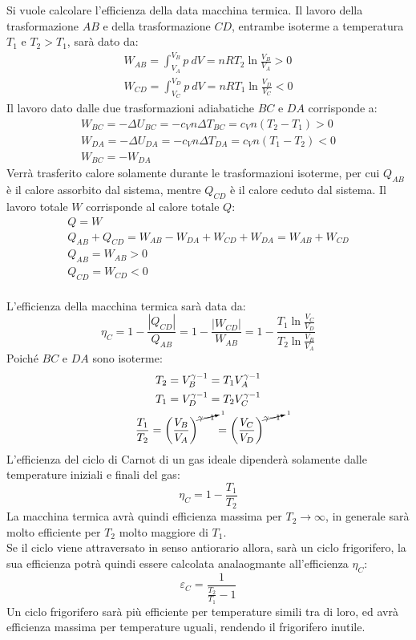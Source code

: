 \documentclass{article}
\numberwithin{equation}{subsection}
\begin{document}
Si vuole calcolare l'efficienza della data macchina termica. Il 
lavoro della trasformazione $AB$ e della trasformazione $CD$, entrambe isoterme a temperatura $T_1$ e $T_2>T_1$, sarà dato da: 
\begin{gather*}
    W_{AB}=\int_{V_A}^{V_B}p\:dV=nRT_2\ln\displaystyle\frac{V_B}{V_A}>0\\
    W_{CD}=\int_{V_C}^{V_D}p\:dV=nRT_1\ln\displaystyle\frac{V_D}{V_C}<0
\end{gather*}
Il lavoro dato dalle due trasformazioni adiabatiche $BC$ e $DA$ corrisponde a:
\begin{gather*}
    W_{BC}=-\Delta U_{BC}=-c_Vn\Delta T_{BC}=c_Vn(T_2-T_1)>0\\
    W_{DA}=-\Delta U_{DA}=-c_Vn\Delta T_{DA}=c_Vn(T_1-T_2)<0\\
    W_{BC}=-W_{DA}
\end{gather*}
Verrà trasferito calore solamente durante le trasformazioni isoterme, per cui 
$Q_{AB}$ è il calore assorbito dal sistema, mentre $Q_{CD}$ è il calore 
ceduto dal sistema. Il lavoro totale $W$ corrisponde al calore totale $Q$:
\begin{gather*}
    Q=W\\
    Q_{AB}+Q_{CD}=W_{AB}-W_{DA}+W_{CD}+W_{DA}=W_{AB}+W_{CD}\\
    Q_{AB}=W_{AB}>0\\
    Q_{CD}=W_{CD}<0
\end{gather*}
\\
L'efficienza della macchina termica sarà data da:
\begin{equation*}
    \eta_C=1-\displaystyle\frac{|Q_{CD}|}{Q_{AB}}=1-\frac{|W_{CD}|}{W_{AB}}=1-\frac{T_1\ln\displaystyle\frac{V_C}{V_D}}{T_2\ln\displaystyle\frac{V_B}{V_A}}
\end{equation*}
Poiché $BC$ e $DA$ sono isoterme:
\begin{gather*}
    T_2=V_B^{\gamma-1}=T_1V_A^{\gamma-1}\\
    T_1=V_D^{\gamma-1}=T_2V_C^{\gamma-1}\\
    \displaystyle\frac{T_1}{T_2}=\left(\frac{V_B}{V_A}\right)^{\cancelto{1}{\gamma-1}}=\left(\frac{V_C}{V_D}\right)^{\cancelto{1}{\gamma-1}}
\end{gather*}
L'efficienza del ciclo di Carnot di un gas ideale dipenderà solamente dalle temperature iniziali e finali del gas:
\begin{equation}
    \eta_C=1-\displaystyle\frac{T_1}{T_2}
\end{equation}
La macchina termica avrà quindi efficienza massima per $T_2\to\infty$, 
in generale sarà molto efficiente per $T_2$ molto maggiore di $T_1$.
\\
Se il ciclo viene attraversato in senso antiorario allora, sarà un ciclo 
frigorifero, la sua efficienza potrà quindi essere calcolata 
analaogmante all'efficienza $\eta_C$:
\begin{equation}
    \varepsilon_C=\displaystyle\frac{1}{\displaystyle\frac{T_2}{T_1}-1}
\end{equation}
Un ciclo frigorifero sarà più efficiente per temperature simili tra di loro, 
ed avrà efficienza massima per temperature uguali, rendendo il frigorifero 
inutile. 
\end{document}
